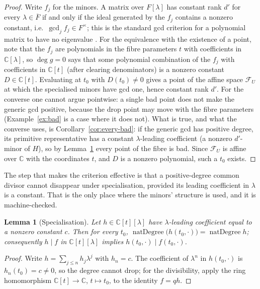 \documentclass[journal]{IEEEtran}
\theoremstyle{plainn}
\newtheorem{lem}[thm]{Lemma}
\theoremstyle{remark}
\begin{document}
\begin{proof}
Write $f_j$ for the minors. A matrix over $F[\lambda]$ has constant rank $d'$ for every
$\lambda\in\overline F$ if and only if the ideal generated by the $f_j$ contains a nonzero constant,
i.e.\ $\gcd_j f_j\in F^{\times}$; this is the standard gcd criterion for a polynomial matrix to have
no eigenvalue \cite[Ch.~6]{vzgg13}. For the equivalence with the existence of a point, note that the
$f_j$ are polynomials in the fibre parameters $t$ with coefficients in $\mathbb C[\lambda]$, so
$\deg g=0$ says that some polynomial combination of the $f_j$ with coefficients in $\mathbb C[t]$ (after clearing denominators)
is a nonzero constant $D\in\mathbb C[t]$. Evaluating at $t_0$ with $D(t_0)\ne0$ gives a point of the
affine space $\mathcal F_U$ at which the specialised minors have gcd one, hence constant rank $d'$.
For the converse one cannot argue pointwise: a single bad point does not make the generic gcd
positive, because the drop point may move with the fibre parameters
(Example~\ref{ex:bad} is a case where it does not). What is true, and what the converse uses, is
Corollary~\ref{cor:every-bad}: if the generic gcd has positive degree, its primitive representative
has a constant $\lambda$-leading coefficient (a nonzero $d'$-minor of $H$), so by
Lemma~\ref{lem:specialize} every point of the fibre is bad. Since $\mathcal F_U$ is affine over
$\mathbb C$ with the coordinates $t$, and $D$ is a nonzero polynomial, such a $t_0$ exists.
\end{proof}

The step that makes the criterion effective is that a positive-degree common divisor cannot
disappear under specialisation, provided its leading coefficient in $\lambda$ is a constant. That is
the only place where the minors' structure is used, and it is machine-checked.

\begin{lem}[Specialisation]\label{lem:specialize}
Let $h\in\mathbb C[t][\lambda]$ have $\lambda$-leading coefficient equal to a nonzero constant $c$.
Then for every $t_0$, $\operatorname{natDegree}\bigl(h(t_0,\cdot)\bigr)=\operatorname{natDegree}h$;
consequently $h\mid f$ in $\mathbb C[t][\lambda]$ implies $h(t_0,\cdot)\mid f(t_0,\cdot)$.
\end{lem}

\begin{proof}
Write $h=\sum_{j\le n}h_j\lambda^{j}$ with $h_n=c$. The coefficient of $\lambda^{n}$ in
$h(t_0,\cdot)$ is $h_n(t_0)=c\ne0$, so the degree cannot drop; for the divisibility, apply the ring
homomorphism $\mathbb C[t]\to\mathbb C$, $t\mapsto t_0$, to the identity $f=qh$.
\end{proof}
\end{document}
